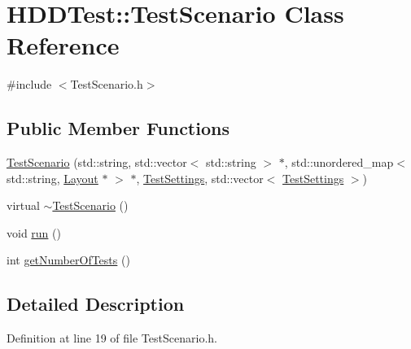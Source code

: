 \hypertarget{class_h_d_d_test_1_1_test_scenario}{\section{H\-D\-D\-Test\-:\-:Test\-Scenario Class Reference}
\label{class_h_d_d_test_1_1_test_scenario}
}


{\ttfamily \#include $<$Test\-Scenario.\-h$>$}

\subsection*{Public Member Functions}
\begin{DoxyCompactItemize}
\item 
\hyperlink{class_h_d_d_test_1_1_test_scenario_abbe9499202d1095c50140f570a2532dc}{Test\-Scenario} (std\-::string, std\-::vector$<$ std\-::string $>$ $\ast$, std\-::unordered\-\_\-map$<$ std\-::string, \hyperlink{class_h_d_d_test_1_1_layout}{Layout} $\ast$ $>$ $\ast$, \hyperlink{struct_h_d_d_test_1_1_test_settings}{Test\-Settings}, std\-::vector$<$ \hyperlink{struct_h_d_d_test_1_1_test_settings}{Test\-Settings} $>$)
\item 
virtual \hyperlink{class_h_d_d_test_1_1_test_scenario_a696957520e2865654b1a3fb862c386c0}{$\sim$\-Test\-Scenario} ()
\item 
void \hyperlink{class_h_d_d_test_1_1_test_scenario_a33ace13f97b5c5ded8da22ca55416c5a}{run} ()
\item 
int \hyperlink{class_h_d_d_test_1_1_test_scenario_afe92bd2a756f3f753f7cb8e8dd59eb53}{get\-Number\-Of\-Tests} ()
\end{DoxyCompactItemize}


\subsection{Detailed Description}


Definition at line 19 of file Test\-Scenario.\-h.



